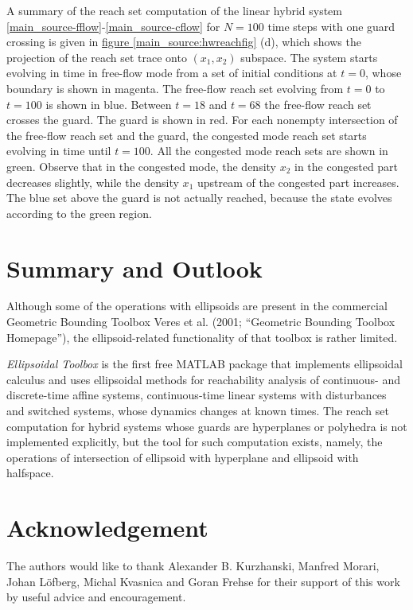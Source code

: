 \documentclass[letterpaper,10pt,english]{sphinxmanual}
\begin{document}
A summary of the reach set computation of the linear hybrid system
\eqref{main_source-fflow}-\eqref{main_source-cflow} for $N=100$ time steps with one guard crossing
is given in \hyperref[main_source:hwreachfig]{figure  \ref*{main_source:hwreachfig}} (d), which shows the projection of the
reach set trace onto $(x_1,x_2)$ subspace. The system starts
evolving in time in free-flow mode from a set of initial conditions at
$t=0$, whose boundary is shown in magenta. The free-flow reach set
evolving from $t=0$ to $t=100$ is shown in blue. Between
$t=18$ and $t=68$ the free-flow reach set crosses the guard.
The guard is shown in red. For each nonempty intersection of the
free-flow reach set and the guard, the congested mode reach set starts
evolving in time until $t=100$. All the congested mode reach sets
are shown in green. Observe that in the congested mode, the density
$x_2$ in the congested part decreases slightly, while the density
$x_1$ upstream of the congested part increases. The blue set above
the guard is not actually reached, because the state evolves according
to the green region.


\chapter{Summary and Outlook}
\label{main_source:summary-and-outlook}
Although some of the operations with ellipsoids are present in the
commercial Geometric Bounding Toolbox Veres et al. (2001; “Geometric
Bounding Toolbox Homepage”), the ellipsoid-related functionality of that
toolbox is rather limited.

\emph{Ellipsoidal Toolbox} is the first free MATLAB package that implements
ellipsoidal calculus and uses ellipsoidal methods for reachability
analysis of continuous- and discrete-time affine systems,
continuous-time linear systems with disturbances and switched systems,
whose dynamics changes at known times. The reach set computation for
hybrid systems whose guards are hyperplanes or polyhedra is not
implemented explicitly, but the tool for such computation exists,
namely, the operations of intersection of ellipsoid with hyperplane and
ellipsoid with halfspace.


\chapter{Acknowledgement}
\label{main_source:acknowledgement}
The authors would like to thank Alexander B. Kurzhanski, Manfred Morari,
Johan Löfberg, Michal Kvasnica and Goran Frehse for their support of
this work by useful advice and encouragement.
\end{document}
